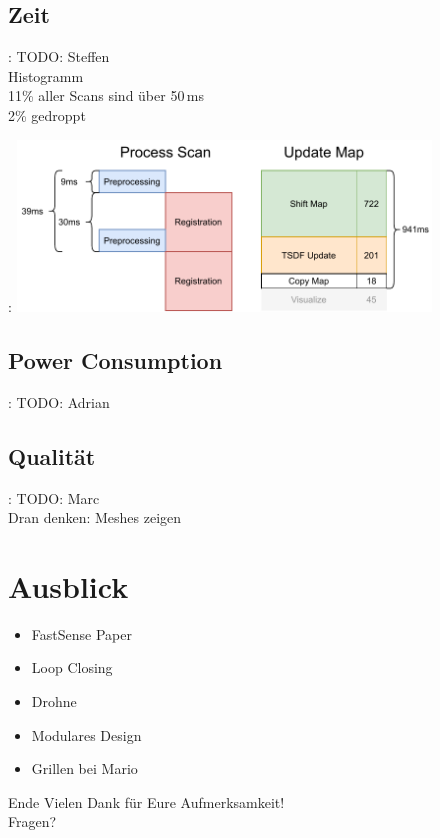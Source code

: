 \documentclass{beamer}
\begin{document}
\subsection{Zeit}
\begin{frame}{\secname: \subsecname}
TODO: Steffen \\
Histogramm \\
11\% aller Scans sind über 50\,ms \\
2\% gedroppt
\end{frame}

\begin{frame}{\secname: \subsecname}
\centering
\includegraphics[width=11cm]{images/Zeiten.pdf}
\end{frame}

\subsection{Power Consumption}
\begin{frame}{\secname: \subsecname}
TODO: Adrian
\end{frame}

\subsection{Qualität}
\begin{frame}{\secname: \subsecname}
TODO: Marc \\
\vspace{2cm}
Dran denken: Meshes zeigen
\end{frame}

\section{Ausblick}
\begin{frame}{\secname}
\begin{itemize}
\item{FastSense Paper}
\item{Loop Closing}
\item{Drohne}
\item{Modulares Design}
\item{Grillen bei Mario}
\end{itemize}
\end{frame}

\begin{frame}{Ende}
\centering\LARGE
Vielen Dank für Eure Aufmerksamkeit!\\\vspace{1cm}
Fragen?
\end{frame}
\end{document}
